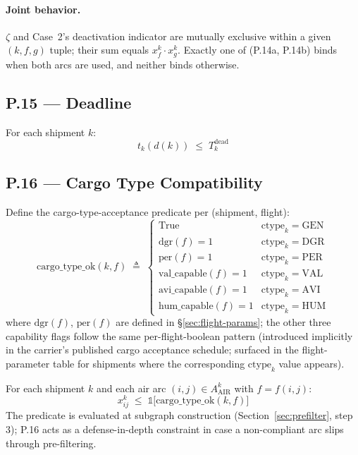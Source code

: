 \documentclass[11pt,a4paper]{article}
\newcommand{\defeq}{\triangleq}
\newcommand{\ctype}{\text{ctype}}
\theoremstyle{definition}
\begin{document}
\paragraph{Joint behavior.}
$\zeta$ and Case~2's deactivation indicator are mutually exclusive within a given
$(k, f, g)$ tuple; their sum equals $x_f^k \cdot x_g^k$. Exactly one of (P.14a, P.14b)
binds when both arcs are used, and neither binds otherwise.

\subsection*{P.15 — Deadline}

For each shipment $k$:
\begin{equation}
  t_k(d(k)) \;\leq\; T_k^{\text{dead}}
  \label{eq:P15}
\end{equation}

\subsection*{P.16 — Cargo Type Compatibility}

Define the cargo-type-acceptance predicate per (shipment, flight):
\begin{equation}
  \text{cargo\_type\_ok}(k, f) \;\defeq\;
  \begin{cases}
    \text{True} & \ctype_k = \text{GEN} \\
    \text{dgr}(f) = 1 & \ctype_k = \text{DGR} \\
    \text{per}(f) = 1 & \ctype_k = \text{PER} \\
    \text{val\_capable}(f) = 1 & \ctype_k = \text{VAL} \\
    \text{avi\_capable}(f) = 1 & \ctype_k = \text{AVI} \\
    \text{hum\_capable}(f) = 1 & \ctype_k = \text{HUM}
  \end{cases}
  \label{eq:cargo-type-ok}
\end{equation}
where $\text{dgr}(f)$, $\text{per}(f)$ are defined in \S\ref{sec:flight-params}; the
other three capability flags follow the same per-flight-boolean pattern (introduced
implicitly in the carrier's published cargo acceptance schedule; surfaced in the
flight-parameter table for shipments where the corresponding $\ctype_k$ value
appears).

For each shipment $k$ and each air arc $(i,j) \in A^k_{\text{AIR}}$ with $f = f(i,j)$:
\begin{equation}
  x_{ij}^k \;\leq\; \mathbb{1}\bigl[\text{cargo\_type\_ok}(k, f)\bigr]
  \label{eq:P16}
\end{equation}
The predicate is evaluated at subgraph construction (Section~\ref{sec:prefilter},
step 3); P.16 acts as a defense-in-depth constraint in case a non-compliant arc
slips through pre-filtering.
\end{document}
